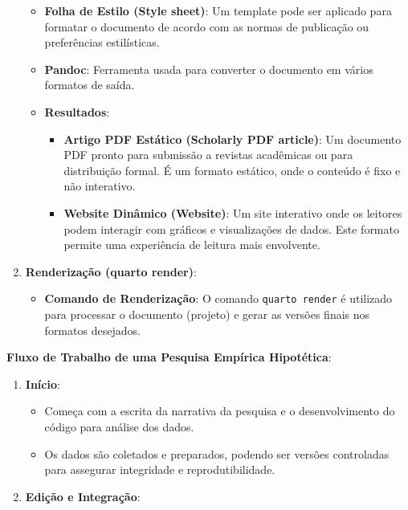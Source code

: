 \documentclass[
  a4paper,
]{article}
\providecommand{\tightlist}{%
  \setlength{\itemsep}{0pt}\setlength{\parskip}{0pt}}\usepackage{longtable,booktabs,array}
\begin{document}
\begin{tcolorbox}
\begin{enumerate}
  \begin{itemize}
  \tightlist
  \item
    \textbf{Folha de Estilo (Style sheet)}: Um template pode ser
    aplicado para formatar o documento de acordo com as normas de
    publicação ou preferências estilísticas.
  \item
    \textbf{Pandoc}: Ferramenta usada para converter o documento em
    vários formatos de saída.
  \item
    \textbf{Resultados}:

    \begin{itemize}
    \tightlist
    \item
      \textbf{Artigo PDF Estático (Scholarly PDF article)}: Um documento
      PDF pronto para submissão a revistas acadêmicas ou para
      distribuição formal. É um formato estático, onde o conteúdo é fixo
      e não interativo.
    \item
      \textbf{Website Dinâmico (Website)}: Um site interativo onde os
      leitores podem interagir com gráficos e visualizações de dados.
      Este formato permite uma experiência de leitura mais envolvente.
    \end{itemize}
  \end{itemize}
\item
  \textbf{Renderização (quarto render)}:

  \begin{itemize}
  \tightlist
  \item
    \textbf{Comando de Renderização}: O comando \texttt{quarto\ render}
    é utilizado para processar o documento (projeto) e gerar as versões
    finais nos formatos desejados.
  \end{itemize}
\end{enumerate}

\textbf{Fluxo de Trabalho de uma Pesquisa Empírica Hipotética}:

\begin{enumerate}
\def\labelenumi{\arabic{enumi}.}
\tightlist
\item
  \textbf{Início}:

  \begin{itemize}
  \tightlist
  \item
    Começa com a escrita da narrativa da pesquisa e o desenvolvimento do
    código para análise dos dados.
  \item
    Os dados são coletados e preparados, podendo ser versões controladas
    para assegurar integridade e reprodutibilidade.
  \end{itemize}
\item
  \textbf{Edição e Integração}:


\end{enumerate}
\end{tcolorbox}
\end{document}
